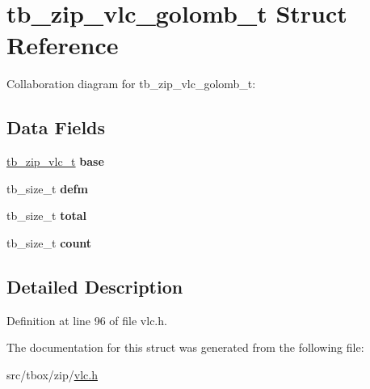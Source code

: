 \hypertarget{structtb__zip__vlc__golomb__t}{\section{tb\-\_\-zip\-\_\-vlc\-\_\-golomb\-\_\-t Struct Reference}
\label{structtb__zip__vlc__golomb__t}
}


Collaboration diagram for tb\-\_\-zip\-\_\-vlc\-\_\-golomb\-\_\-t\-:
\subsection*{Data Fields}
\begin{DoxyCompactItemize}
\item 
\hypertarget{structtb__zip__vlc__golomb__t_aee65f3a96563d12bea7d52e70ce5fe9d}{\hyperlink{structtb__zip__vlc__t}{tb\-\_\-zip\-\_\-vlc\-\_\-t} {\bfseries base}}\label{structtb__zip__vlc__golomb__t_aee65f3a96563d12bea7d52e70ce5fe9d}

\item 
\hypertarget{structtb__zip__vlc__golomb__t_a98f9b95e4a67bca33767bf152b56c544}{tb\-\_\-size\-\_\-t {\bfseries defm}}\label{structtb__zip__vlc__golomb__t_a98f9b95e4a67bca33767bf152b56c544}

\item 
\hypertarget{structtb__zip__vlc__golomb__t_a823c7369758708aafdee101b13796d9a}{tb\-\_\-size\-\_\-t {\bfseries total}}\label{structtb__zip__vlc__golomb__t_a823c7369758708aafdee101b13796d9a}

\item 
\hypertarget{structtb__zip__vlc__golomb__t_affd0595d957aa684762006994970c4cd}{tb\-\_\-size\-\_\-t {\bfseries count}}\label{structtb__zip__vlc__golomb__t_affd0595d957aa684762006994970c4cd}

\end{DoxyCompactItemize}


\subsection{Detailed Description}


Definition at line 96 of file vlc.\-h.



The documentation for this struct was generated from the following file\-:\begin{DoxyCompactItemize}
\item 
src/tbox/zip/\hyperlink{vlc_8h}{vlc.\-h}\end{DoxyCompactItemize}
